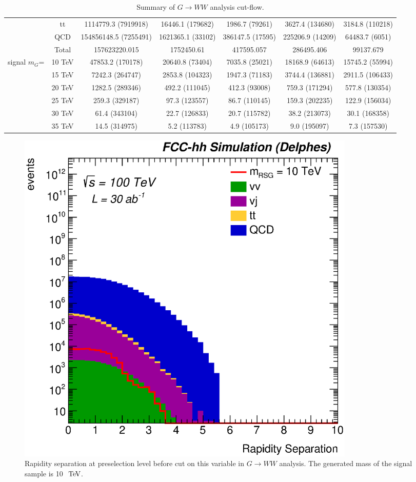 \documentclass{cernrep}
\begin{document}
\begin{landscape}
\begin{table}[!htb]
{\begin{tabular}{|c|c|c|c|c|c|c|}
                & tt            & 1114779.3 (7919918)   & 16446.1 (179682)  & 1986.7 (79261)   & 3627.4 (134680)  & 3184.8 (110218)  \\
                & QCD           & 154856148.5 (7255491) & 1621365.1 (33102) & 386147.5 (17595) & 225206.9 (14209) & 64483.7 (6051)   \\
                & Total         & 157623220.015         & 1752450.61        & 417595.057       & 286495.406       & 99137.679        \\
\hline
signal $m_{G}$= & 10 TeV        & 47853.2 (170178)      & 20640.8 (73404)   & 7035.8 (25021)   & 18168.9 (64613)  & 15745.2 (55994) \\
                & 15 TeV        & 7242.3 (264747)       & 2853.8 (104323)   & 1947.3 (71183)   & 3744.4 (136881)  & 2911.5 (106433) \\
                & 20 TeV        & 1282.5 (289346)       & 492.2 (111045)    & 412.3 (93008)    & 759.3 (171294)   & 577.8 (130354)  \\
                & 25 TeV        & 259.3 (329187)        & 97.3 (123557)     & 86.7 (110145)    & 159.3 (202235)   & 122.9 (156034)  \\
                & 30 TeV        & 61.4 (343104)         & 22.7 (126833)     & 20.7 (115782)    & 38.2 (213073)    & 30.1 (168358)   \\
                & 35 TeV        & 14.5 (314975)         & 5.2 (113783)      & 4.9 (105173)     & 9.0 (195097)     & 7.3 (157530)    \\
\hline
\hline
\end{tabular}}
\caption{Summary of $G \rightarrow WW$ analysis cut-flow.}
\label{tab:RSGww_cutflow}
\end{table}
\end{landscape}

\begin{figure}[!htb]\centering
\includegraphics[width=0.8\textwidth]{Fig/RSGww/rapiditySeparation_sel0_before_cut_nostack_log.eps}
\caption{Rapidity separation at preselection level before cut on this variable in $G \rightarrow WW$ analysis. The generated mass of the signal sample is 10 $\TeV$.}
\label{fig:RSGww_sel0_rapidity}
\end{figure}
\end{document}

